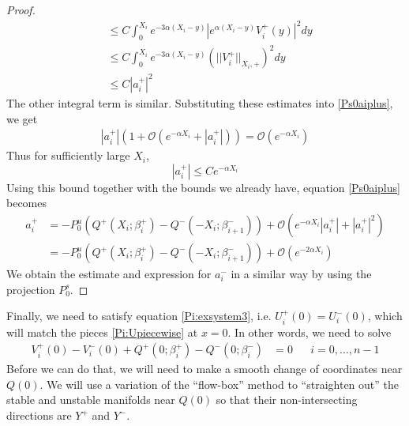 \documentclass[thesis.tex]{subfiles}
\begin{document}
\begin{lemma}
\begin{proof}
\begin{align*}
&\leq C \int_0^{X_i}e^{-3 \alpha (X_i - y)} |e^{\alpha(X_i - y)} V_i^+(y)|^2 dy \\
&\leq C \int_0^{X_i}e^{-3 \alpha (X_i - y)} (||V_i^+||_{X_i, +})^2 dy \\
&\leq C |a_i^+|^2
\end{align*}
The other integral term is similar. Substituting these estimates into \eqref{Ps0aiplus}, we get
\begin{align*}
|a_i^+|\left(1 + \mathcal{O}(e^{-\alpha X_i} + |a_i^+|) \right) =  
\mathcal{O}( e^{-\alpha X_i} )
\end{align*}
Thus for sufficiently large $X_i$, 
\[
|a_i^+| \leq C e^{-\alpha X_i}
\]
Using this bound together with the bounds we already have, equation \eqref{Ps0aiplus} becomes
\begin{align*}
a_i^+ &= -P^u_0 \left( Q^+(X_i; \beta_i^+) - Q^-(-X_i; \beta_{i+1}^-) \right) 
+ \mathcal{O}\left( e^{-\alpha X_i} |a_i^+| + |a_i^+|^2 \right) \\
&= -P^u_0 \left( Q^+(X_i; \beta_i^+) - Q^-(-X_i; \beta_{i+1}^-) \right) 
+ \mathcal{O}\left( e^{-2 \alpha X_i} \right)
\end{align*}
We obtain the estimate and expression for $a_i^-$ in a similar way by using the projection $P_0^s$.
\end{proof}
\end{lemma}

Finally, we need to satisfy equation \eqref{Pi:exsystem3}, i.e. $U_i^+(0) = U_i^-(0)$, which will match the pieces \eqref{Pi:Upiecewise} at $x = 0$. In other words, we need to solve
\begin{align}\label{Umatchat0}
V_i^+(0) - V_i^-(0) + Q^+(0; \beta_i^+) - Q^-(0; \beta_i^-) &= 0  && i = 0, \dots, n-1
\end{align}
Before we can do that, we will need to make a smooth change of coordinates near $Q(0)$. We will use a variation of the ``flow-box'' method to ``straighten out'' the stable and unstable manifolds near $Q(0)$ so that their non-intersecting directions are $Y^+$ and $Y^-$.

\end{document}
